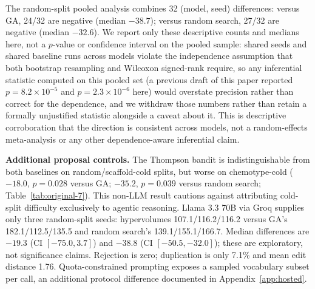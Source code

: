\documentclass{article}
\begin{document}
The random-split pooled analysis combines 32 (model, seed) differences: versus GA, 24/32 are negative (median $-38.7$); versus random search, 27/32 are negative (median $-32.6$). We report only these descriptive counts and medians here, not a $p$-value or confidence interval on the pooled sample: shared seeds and shared baseline runs across models violate the independence assumption that both bootstrap resampling and Wilcoxon signed-rank require, so any inferential statistic computed on this pooled set (a previous draft of this paper reported $p=8.2\times10^{-5}$ and $p=2.3\times10^{-6}$ here) would overstate precision rather than correct for the dependence, and we withdraw those numbers rather than retain a formally unjustified statistic alongside a caveat about it. This is descriptive corroboration that the direction is consistent across models, not a random-effects meta-analysis or any other dependence-aware inferential claim.

\textbf{Additional proposal controls.} The Thompson bandit is indistinguishable from both baselines on random/scaffold-cold splits, but worse on chemotype-cold ($-18.0$, $p=0.028$ versus GA; $-35.2$, $p=0.039$ versus random search; Table~\ref{tab:original-7}). This non-LLM result cautions against attributing cold-split difficulty exclusively to agentic reasoning. Llama 3.3 70B via Groq supplies only three random-split seeds: hypervolumes 107.1/116.2/116.2 versus GA's 182.1/112.5/135.5 and random search's 139.1/155.1/166.7. Median differences are $-19.3$ (CI $[-75.0,3.7]$) and $-38.8$ (CI $[-50.5,-32.0]$); these are exploratory, not significance claims. Rejection is zero; duplication is only 7.1\% and mean edit distance 1.76. Quota-constrained prompting exposes a sampled vocabulary subset per call, an additional protocol difference documented in Appendix~\ref{app:hosted}.
\end{document}
